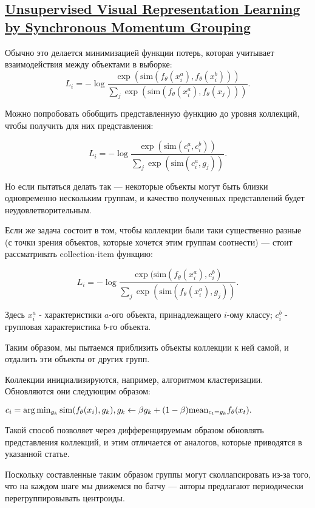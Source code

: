 \documentclass{article}
\begin{document}
\subsection{\href{https://arxiv.org/pdf/2207.06167v1.pdf}{Unsupervised Visual Representation Learning
by Synchronous Momentum Grouping}}

Обычно это делается минимизацией функции потерь, которая учитывает взаимодействия между объектами в выборке:
$$
L_i = - \log \frac{\exp(\mathrm{sim}(f_\theta(x_i^a), f_\theta(x_i^b)))}{\sum_j \exp(\mathrm{sim}(f_\theta(x_i^a), f_\theta(x_j)))}.
$$

Можно попробовать обобщить представленную функцию до уровня коллекций, чтобы получить для них представления:

$$
L_i = - \log \frac{\exp(\mathrm{sim}(c_i^a, c_i^b))}{\sum_j \exp(\mathrm{sim}(c_i^a, g_j))}.
$$

Но если пытаться делать так --- некоторые объекты могут быть близки одновременно нескольким группам, и качество полученных представлений будет неудовлетворительным.

Если же задача состоит в том, чтобы коллекции были таки существенно разные (с точки зрения объектов, которые хочется этим группам соотнести) --- стоит рассматривать collection-item функцию:

$$
L_i = - \log \frac{\exp(\mathrm{sim}(f_\theta(x_i^a), c_i^b)}{\sum_j \exp(\mathrm{sim}(f_\theta(x_i^a), g_j))}.
$$

Здесь $x_i^a$ - характеристики $a$-ого объекта, принадлежащего $i$-ому классу; $c_i^b$ - групповая характеристика $b$-го объекта.

Таким образом, мы пытаемся приблизить объекты коллекции к ней самой, и отдалить эти объекты от других групп.

Коллекции инициализируются, например, алгоритмом кластеризации. Обновляются они следующим образом:

\begin{center}
$
c_i = \arg \min_{g_k}\mathrm{sim}(f_{\theta}(x_i), g_k), \\
g_k \leftarrow \beta g_k + (1 - \beta) \mathrm{mean}_{c_t = g_k} f_{\theta}(x_t).
$
\end{center}

Такой способ позволяет через дифференцируемым образом обновлять представления коллекций, и этим отличается от аналогов, которые приводятся в указанной статье.

Поскольку составленные таким образом группы могут сколлапсировать из-за того, что на каждом шаге мы движемся по батчу --- авторы предлагают периодически перегруппировывать центроиды.
\end{document}
